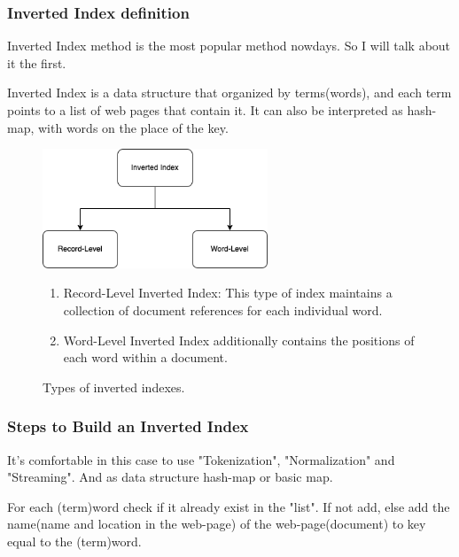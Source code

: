 \documentclass[10pt,a4paper]{article}
\begin{document}
\subsubsection{Inverted Index definition}
Inverted Index method is the most popular method nowdays. So I will talk about it the first.

Inverted Index is a data structure that organized by terms(words), and each term points to a list of web pages that contain it. It can also be interpreted as hash-map, with words on the place of the key.


\begin{figure}
  \centering
  \captionsetup{labelformat=empty}  %
  \caption{Types of inverted indexes.}
  \includegraphics[width=0.6\textwidth]{for_mip.drawio.png}  %
  
  \begin{enumerate}[label=\textbullet]
      \item Record-Level Inverted Index: This type of index maintains a collection of document references for each individual word.
      \item Word-Level Inverted Index additionally contains the positions of each word within a document.
  \end{enumerate}
\end{figure}

\hrulefill

\subsubsection{Steps to Build an Inverted Index}

It's comfortable in this case to use "Tokenization", "Normalization" and "Streaming". And as data structure hash-map or basic map. 

For each (term)word check if it already exist in the "list". If not add, else add the name(name and location in the web-page) of the web-page(document) to key equal to the (term)word.
\end{document}
